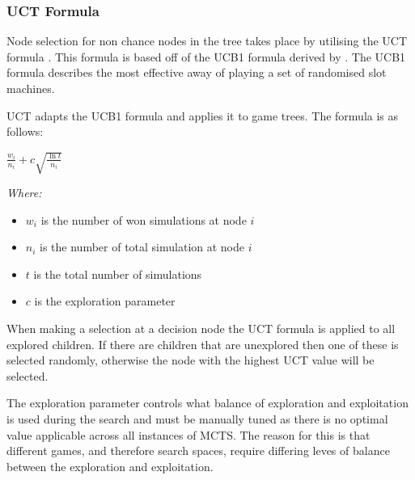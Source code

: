 \documentclass[]{article}
\begin{document}
\subsubsection{UCT Formula}
Node selection for non chance nodes in the tree takes place by utilising the UCT formula \autocite{kocsis2006bandit}. This formula is based off of the UCB1 formula derived by \textcite{auer2002finite}. The UCB1 formula describes the most effective away of playing a set of randomised slot machines. 

\par UCT adapts the UCB1 formula and applies it to game trees. The formula is as follows: 

\vspace{0.2cm}
\begin{center}
	\large
	$\frac{w_i}{n_i} + c\sqrt{\frac{\ln t}{n_i} }$
\end{center}

\textit{Where: }
\begin{itemize}
\item $w_i$ is the number of won simulations at node $i$
\item $n_i$ is the number of total simulation at node $i$
\item $t$ is the total number of simulations
\item $c$ is the exploration parameter
\end{itemize}

\par When making a selection at a decision node the UCT formula is applied to all explored children. If there are children that are unexplored then one of these is selected randomly, otherwise the node with the highest UCT value will be selected.

\par The exploration parameter controls what balance of exploration and exploitation is used during the search and must be manually tuned as there is no optimal value applicable across all instances of MCTS. The reason for this is that different games, and therefore search spaces, require differing leves of balance between the exploration and exploitation.  
\end{document}
